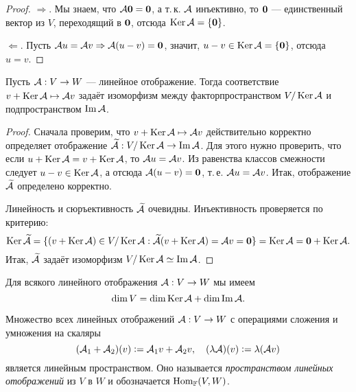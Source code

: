\begin{proof}
    $\Rightarrow$. Мы знаем, что $\mathcal{A}\boldsymbol{0} = \boldsymbol{0}$, а т.\,к. $\mathcal{A}$ инъективно, то $\boldsymbol{0}$ --- единственный вектор из $V$, переходящий в $\boldsymbol{0}$, отсюда $\operatorname{Ker}\mathcal{A} = \{\boldsymbol{0}\}$.

    $\Leftarrow$. Пусть $\mathcal{A} u = \mathcal{A} v \Rightarrow \mathcal{A}(u - v) = \boldsymbol{0}$, значит, $u - v \in \operatorname{Ker}\mathcal{A} = \{\boldsymbol{0}\}$, отсюда $u = v$.
\end{proof}

\begin{theorem}
    Пусть $\mathcal{A}: V \to W$ --- линейное отображение. Тогда соответствие $v + \operatorname{Ker}\mathcal{A} \mapsto \mathcal{A} v$ задаёт изоморфизм между факторпространством $V / \operatorname{Ker}\mathcal{A}$ и подпространством $\operatorname{Im}\mathcal{A}$.
\end{theorem}

\begin{proof}
    Сначала проверим, что $v + \operatorname{Ker}\mathcal{A} \mapsto \mathcal{A} v$ действительно корректно определяет отображение $\widetilde{\mathcal{A}}: V / \operatorname{Ker}\mathcal{A} \to \operatorname{Im}\mathcal{A}$. Для этого нужно проверить, что если $u + \operatorname{Ker}\mathcal{A} = v + \operatorname{Ker}\mathcal{A}$, то $\mathcal{A} u = \mathcal{A} v$. Из равенства классов смежности следует $u - v \in \operatorname{Ker}\mathcal{A}$, а отсюда $\mathcal{A}(u - v) = \boldsymbol{0}$, т.\,е. $\mathcal{A} u = \mathcal{A} v$. Итак, отображение $\widetilde{\mathcal{A}}$ определено корректно.

    Линейность и сюръективность $\widetilde{\mathcal{A}}$ очевидны. Инъективность проверяется по критерию: \[\operatorname{Ker}\widetilde{\mathcal{A}} = \{(v + \operatorname{Ker}\mathcal{A}) \in V / \operatorname{Ker}\mathcal{A} : \widetilde{\mathcal{A}}(v + \operatorname{Ker}\mathcal{A}) = \mathcal{A} v = \boldsymbol{0}\} = \operatorname{Ker}\mathcal{A} = \boldsymbol{0} + \operatorname{Ker}\mathcal{A}.\] Итак, $\widetilde{\mathcal{A}}$ задаёт изоморфизм $V / \operatorname{Ker}\mathcal{A} \simeq \operatorname{Im}\mathcal{A}$.
\end{proof}

\begin{corollary}
    Для всякого линейного отображения $\mathcal{A}: V \to W$ мы имеем \[\dim V = \dim\operatorname{Ker}\mathcal{A} + \dim\operatorname{Im}\mathcal{A}.\]
\end{corollary}

\begin{definition}
    Множество всех линейных отображений $\mathcal{A}: V \to W$ с операциями сложения и умножения на скаляры
    \[
        (\mathcal{A}_1 + \mathcal{A}_2)(v) \vcentcolon = \mathcal{A}_1v + \mathcal{A}_2v,\quad (\lambda\mathcal{A})(v) \vcentcolon = \lambda(\mathcal{A} v)
    \]
    является линейным пространством. Оно называется \textit{пространством линейных отображений} из $V$ в $W$ и обозначается $\operatorname{Hom}_{\mathbb{F}}(V, W)$.
\end{definition}

